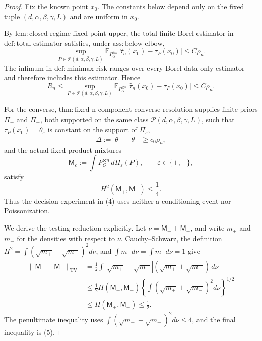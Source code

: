 \documentclass{article}
\begin{document}
\begin{proof}
Fix the known point \(x_0\).  The constants below depend only on the fixed tuple \((d,\alpha,\beta,\gamma,L)\) and are uniform in \(x_0\).

By \(\mathrm{lem:closed\mbox{-}regime\mbox{-}fixed\mbox{-}point\mbox{-}upper}\), the total finite Borel estimator in \(\mathrm{def:total\mbox{-}estimator}\) satisfies, under \(\mathrm{ass:below\mbox{-}elbow}\),
\[
 \sup_{P\in\mathcal P(d,\alpha,\beta,\gamma,L)}
 \mathbb E_{P_O^{\otimes n}}
 \left|\widehat\tau_n(x_0)-\tau_P(x_0)\right|
 \le C\rho_n.                                                    \tag{1}
\]
The infimum in \(\mathrm{def:minimax\mbox{-}risk}\) ranges over every Borel data-only estimator and therefore includes this estimator.  Hence
\[
 R_n\le
 \sup_{P\in\mathcal P(d,\alpha,\beta,\gamma,L)}
 \mathbb E_{P_O^{\otimes n}}
 \left|\widehat\tau_n(x_0)-\tau_P(x_0)\right|
 \le C\rho_n.                                                    \tag{2}
\]

For the converse, \(\mathrm{thm:fixed\mbox{-}n\mbox{-}component\mbox{-}converse\mbox{-}resolution}\) supplies finite priors \(\Pi_+\) and \(\Pi_-\), both supported on the same class \(\mathcal P(d,\alpha,\beta,\gamma,L)\), such that \(\tau_P(x_0)=\theta_\varepsilon\) is constant on the support of \(\Pi_\varepsilon\),
\[
 \Delta:=|\theta_+-\theta_-|\ge c_0\rho_n,                     \tag{3}
\]
and the actual fixed-product mixtures
\[
 \mathsf M_\varepsilon
 :=\int P_O^{\otimes n}\,d\Pi_\varepsilon(P),
 \qquad \varepsilon\in\{+,-\},                                \tag{4}
\]
satisfy
\[
 H^2(\mathsf M_+,\mathsf M_-)\le\frac14.                       \tag{5}
\]
Thus the decision experiment in (4) uses neither a conditioning event nor Poissonization.

We derive the testing reduction explicitly.  Let \(\nu=\mathsf M_++\mathsf M_-\), and write \(m_+\) and \(m_-\) for the densities with respect to \(\nu\).  Cauchy--Schwarz, the definition \(H^2=\int(\sqrt{m_+}-\sqrt{m_-})^2d\nu\), and \(\int m_+d\nu=\int m_-d\nu=1\) give
\[
\begin{aligned}
 \lVert\mathsf M_+-\mathsf M_-\rVert_{\mathrm{TV}}
 &=\frac12\int|\sqrt{m_+}-\sqrt{m_-}|(\sqrt{m_+}+\sqrt{m_-})\,d\nu\\
 &\le\frac12H(\mathsf M_+,\mathsf M_-)
 \left\{\int(\sqrt{m_+}+\sqrt{m_-})^2d\nu\right\}^{1/2}\\
 &\le H(\mathsf M_+,\mathsf M_-)
 \le\frac12.                                                     \tag{6}
\end{aligned}
\]
The penultimate inequality uses \(\int(\sqrt{m_+}+\sqrt{m_-})^2d\nu\le4\), and the final inequality is (5).


\end{proof}
\end{document}
